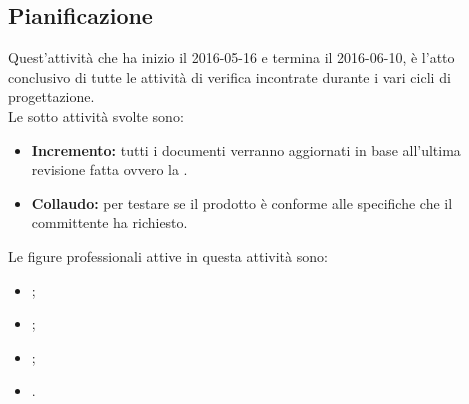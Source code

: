 \documentclass[12pt,a4paper]{article}
\begin{document}
\subsection{Pianificazione}
Quest'attività che ha inizio il 2016-05-16 e termina il 2016-06-10, è l'atto conclusivo di tutte le attività di verifica incontrate durante i vari cicli di progettazione.
\\Le sotto attività svolte sono:
\begin{itemize}
	\item \textbf{Incremento:} tutti i documenti verranno aggiornati in base all'ultima revisione fatta ovvero la \RQ.
	\item \textbf{Collaudo:} per testare se il prodotto è conforme alle specifiche che il committente ha richiesto.
\end{itemize}
Le figure professionali attive in questa attività sono:
\begin{itemize}
	\item \PM;
	\item \AM;
	\item \PG;
	\item \VR.
\end{itemize}
\newpage
\end{document}

